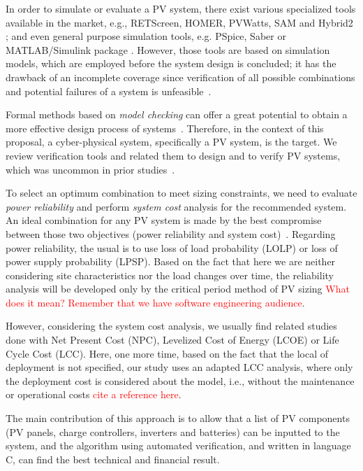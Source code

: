 \documentclass[10pt,conference]{IEEEtran}
\begin{document}
In order to simulate or evaluate a PV system, there exist various specialized tools available in the market, e.g., RETScreen, HOMER, PVWatts, SAM and Hybrid2 \cite{Pradhan,Swarnkar,NRELDobos,NRELBlair,Mills}; and even general purpose simulation tools, e.g. PSpice, Saber or MATLAB/Simulink package \cite{Gow1999,Benatiallah2017}. However, those tools are based on simulation models, which are employed before the system design is concluded; it has the drawback of an incomplete coverage since verification of all possible combinations and potential failures of a system is unfeasible~\cite{ClarkeHV18}.

Formal methods based on \textit{model checking} can offer a great potential to obtain a more effective design process of systems~\cite{ClarkeHV18}. Therefore, in the context of this proposal, a cyber-physical system, specifically a PV system, is the target. We review verification tools and related them to design and to verify PV systems, which was uncommon in prior studies~\cite{abs-1811-09438}. 

To select an optimum combination to meet sizing constraints, we need to evaluate \textit{power reliability} and perform \textit{system cost} analysis for the recommended system. An ideal combination for any PV system is made by the best compromise between those two objectives (power reliability and system cost)~\cite{Alsadi2018}. 
Regarding power reliability, the usual is to use loss of load probability (LOLP) or loss of power supply probability (LPSP). Based on the fact that here we are neither considering site characteristics nor the load changes over time, the reliability analysis will be developed only by the critical period method of PV sizing \textcolor{red}{What does it mean? Remember that we have software engineering audience}. 

However, considering the system cost analysis, we usually find related studies done with Net Present Cost (NPC), Levelized Cost of Energy (LCOE) or Life Cycle Cost (LCC). Here, one more time, based on the fact that the local of deployment is not specified, our study uses an adapted LCC analysis, where only the deployment cost is considered about the model, i.e., without the maintenance or operational costs \textcolor{red}{cite a reference here}.

The main contribution of this approach is to allow that a list of PV components (PV panels, charge controllers, inverters and batteries) can be inputted to the system, and the algorithm using automated verification, and written in language C, can find the best technical and financial result.
\end{document}
